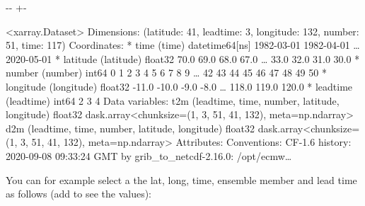 \documentclass[letterpaper,10pt,english]{sphinxmanual}
\newlength\nbsphinxcodecellspacing
\begin{document}
{

\kern-\sphinxverbatimsmallskipamount\kern-\baselineskip
\kern+\FrameHeightAdjust\kern-\fboxrule
\vspace{\nbsphinxcodecellspacing}

\begin{sphinxVerbatim}[commandchars=\\\{\}]
\llap{\color{nbsphinxout}[8]:\,\hspace{\fboxrule}\hspace{\fboxsep}}<xarray.Dataset>
Dimensions:    (latitude: 41, leadtime: 3, longitude: 132, number: 51, time: 117)
Coordinates:
  * time       (time) datetime64[ns] 1982-03-01 1982-04-01 {\ldots} 2020-05-01
  * latitude   (latitude) float32 70.0 69.0 68.0 67.0 {\ldots} 33.0 32.0 31.0 30.0
  * number     (number) int64 0 1 2 3 4 5 6 7 8 9 {\ldots} 42 43 44 45 46 47 48 49 50
  * longitude  (longitude) float32 -11.0 -10.0 -9.0 -8.0 {\ldots} 118.0 119.0 120.0
  * leadtime   (leadtime) int64 2 3 4
Data variables:
    t2m        (leadtime, time, number, latitude, longitude) float32 dask.array<chunksize=(1, 3, 51, 41, 132), meta=np.ndarray>
    d2m        (leadtime, time, number, latitude, longitude) float32 dask.array<chunksize=(1, 3, 51, 41, 132), meta=np.ndarray>
Attributes:
    Conventions:  CF-1.6
    history:      2020-09-08 09:33:24 GMT by grib\_to\_netcdf-2.16.0: /opt/ecmw{\ldots}
\end{sphinxVerbatim}
}

You can for example select a the lat, long, time, ensemble member and lead time as follows (add  to see the values):

{
\begin{sphinxVerbatim}[commandchars=\\\{\}]
\llap{\color{nbsphinxin}[29]:\,\hspace{\fboxrule}\hspace{\fboxsep}}  
\end{sphinxVerbatim}
}
\end{document}
